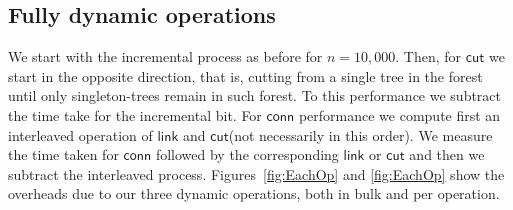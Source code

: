 \documentclass{elsarticle}
\newcommand{\MATHSF}[1]{\ensuremath{\mathsf{#1}}\xspace}
\newcommand{\link}{\MATHSF{link}}
\newcommand{\cut}{\MATHSF{cut}}
\newcommand{\conn}{\MATHSF{conn}}
\begin{document}
\subsection{Fully dynamic operations} 
We start with the incremental process as before for $n=10,000$. Then, for \cut we start in the opposite direction, that is, cutting from a single tree in the forest until only singleton-trees remain in such forest. To this performance we subtract the time take for the incremental bit. For \conn performance we compute first an interleaved operation of \link and \cut (not necessarily in this order). We measure the time taken for \conn followed by the corresponding \link or \cut and then we subtract the interleaved process. Figures~\ref{fig:EachOp} and \ref{fig:EachOp} show the overheads due to our three dynamic operations, both in bulk and per operation.
\end{document}
